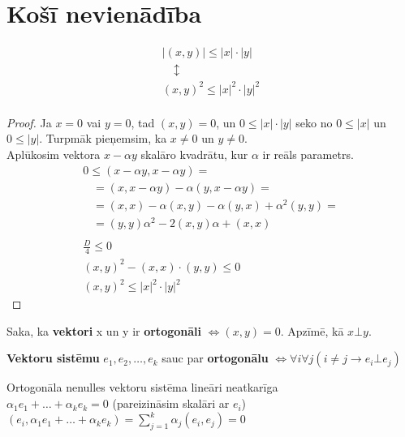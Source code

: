 \documentclass[12pt]{article}
\begin{document}
\section*{Košī nevienādība}

\begin{gather*}
|(x,y)| \leq |x| \cdot |y|  \\
  \quad \updownarrow \\
(x,y)^2 \leq |x|^2 \cdot |y|^2  \\
\end{gather*}

\begin{proof} Ja $ x = 0 $ vai $ y = 0 $, tad $(x,y) = 0 $, un $0 \leq |x| \cdot |y|$ seko no $ 0 	\leq |x|$ un $0 \leq |y|$. Turpmāk pieņemsim, ka $x \neq 0$ un $y \neq 0$. \\

	Aplūkosim vektora $x - \alpha y$ skalāro kvadrātu, kur $\alpha$ ir reāls parametrs.
	\begin{gather*}
 		0 \leq (x - \alpha y, x-\alpha y) =  \\
 		\; \; \; = (x, x - \alpha y) - \alpha (y, x - \alpha y) = \\
 		\; \; \; =  (x,x) - \alpha (x,y) - \alpha (y,x) + \alpha^2 (y,y) = \\
 		\; \; \; = (y,y) \alpha^2 - 2 (x,y) \alpha + (x,x) \\
		\\
		\frac{D}{4} \leq 0 \\
		(x,y)^2 - (x,x) \cdot (y,y) \leq 0 \\
		(x,y)^2 \leq |x|^2 \cdot |y|^2
	\end{gather*}
\end{proof}

\begin{definition} Saka, ka  \textbf{vektori} x un y ir \textbf{ortogonāli} $\Leftrightarrow (x,y) = 0$. Apzīmē, kā $ x \bot y$.
\end{definition} 

\begin{definition} \textbf{Vektoru sistēmu} $e_1, e_2, \ldots, e_k$ sauc par \textbf{ortogonālu}   
	$\Leftrightarrow  \forall i \forall j (i \neq j  \rightarrow e_i  \bot e_j)$
\end{definition}

\begin{theorem} Ortogonāla nenulles vektoru sistēma lineāri neatkarīga \\
	$\alpha_1e_1 + \ldots + \alpha_ke_k = 0$ (pareizināsim skalāri ar $e_i$) \\
	$(e_i, \alpha_1e_1 + \ldots + \alpha_ke_k) = \sum_{j=1}^{k}\alpha_j(e_i,e_j) = 0$
\end{theorem}
\end{document}
